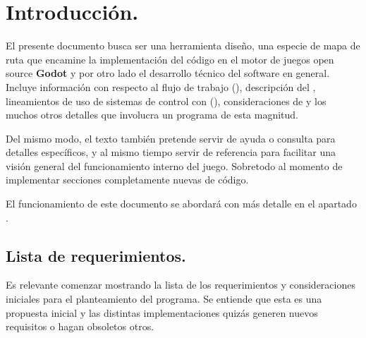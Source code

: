 
\section{Introducción.}\label{intro:introduccion}
El presente documento busca ser una herramienta diseño, una especie de mapa de ruta que encamine la implementación del código en el motor de juegos open source \textbf{Godot} y por otro lado el desarrollo técnico del software en general. Incluye información con respecto al flujo de trabajo (), descripción del , lineamientos de uso de sistemas de control con  (), consideraciones de  y los muchos otros detalles que involucra un programa de esta magnitud.

Del mismo modo, el texto también pretende servir de ayuda o consulta para detalles específicos, y al mismo tiempo servir de referencia para facilitar una visión general del funcionamiento interno del juego. Sobretodo al momento de implementar secciones completamente nuevas de código.

El funcionamiento de este documento se abordará con más detalle en el apartado .

\subsection{Lista de requerimientos.}\label{intro:lista-de-requerimientos}
Es relevante comenzar mostrando la lista de los requerimientos y consideraciones iniciales para el planteamiento del programa. Se entiende que esta es una propuesta inicial y las distintas implementaciones quizás generen nuevos requisitos o hagan obsoletos otros.

